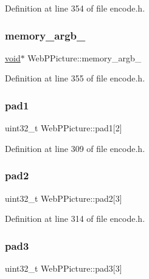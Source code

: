 Definition at line 354 of file encode.\+h.

\mbox{\label{struct_web_p_picture_a174ea809a6be39363b58b968a54d17c4}} 
\subsubsection{\texorpdfstring{memory\_argb\_}{memory\_argb\_}}
{\footnotesize\ttfamily \mbox{\hyperlink{_s_d_l__opengles2__gl2ext_8h_ae5d8fa23ad07c48bb609509eae494c95}{void}}$\ast$ Web\+P\+Picture\+::memory\+\_\+argb\+\_\+}



Definition at line 355 of file encode.\+h.

\mbox{\label{struct_web_p_picture_a4bf90baa1a76c06e7e96f9fdcd42e357}} 
\subsubsection{\texorpdfstring{pad1}{pad1}}
{\footnotesize\ttfamily uint32\+\_\+t Web\+P\+Picture\+::pad1\mbox{[}2\mbox{]}}



Definition at line 309 of file encode.\+h.

\mbox{\label{struct_web_p_picture_a04eb477a2e0e0895691a59895b156af8}} 
\subsubsection{\texorpdfstring{pad2}{pad2}}
{\footnotesize\ttfamily uint32\+\_\+t Web\+P\+Picture\+::pad2\mbox{[}3\mbox{]}}



Definition at line 314 of file encode.\+h.

\mbox{\label{struct_web_p_picture_a746b6fce2fb6239117e1c0e34dc434a9}} 
\subsubsection{\texorpdfstring{pad3}{pad3}}
{\footnotesize\ttfamily uint32\+\_\+t Web\+P\+Picture\+::pad3\mbox{[}3\mbox{]}}



